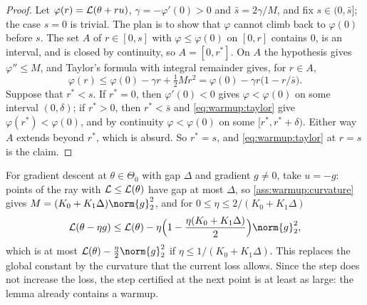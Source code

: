 \begin{refsection}
\begin{proof}
Let $\varphi(r)=\mathcal{L}(\theta+ru)$, $\gamma=-\varphi'(0)>0$ and $\bar s=2\gamma/M$, and fix $s\in(0,\bar s]$; the case $s=0$ is trivial. The plan is to show that $\varphi$ cannot climb back to $\varphi(0)$ before $s$. The set $A$ of $r\in[0,s]$ with $\varphi\le\varphi(0)$ on $[0,r]$ contains $0$, is an interval, and is closed by continuity, so $A=[0,r^*]$. On $A$ the hypothesis gives $\varphi''\le M$, and Taylor's formula with integral remainder gives, for $r\in A$,
\begin{equation}\label{eq:warmup:taylor}
  \varphi(r)\le\varphi(0)-\gamma r+\tfrac12Mr^2=\varphi(0)-\gamma r\bigl(1-r/\bar s\bigr).
\end{equation}
Suppose that $r^*<s$. If $r^*=0$, then $\varphi'(0)<0$ gives $\varphi<\varphi(0)$ on some interval $(0,\delta)$; if $r^*>0$, then $r^*<\bar s$ and \eqref{eq:warmup:taylor} give $\varphi(r^*)<\varphi(0)$, and by continuity $\varphi<\varphi(0)$ on some $[r^*,r^*+\delta)$. Either way $A$ extends beyond $r^*$, which is absurd. So $r^*=s$, and \eqref{eq:warmup:taylor} at $r=s$ is the claim.
\end{proof}

For gradient descent at $\theta\in\Theta_0$ with gap $\Delta$ and gradient $g\ne0$, take $u=-g$: points of the ray with $\mathcal{L}\le\mathcal{L}(\theta)$ have gap at most $\Delta$, so \cref{ass:warmup:curvature} gives $M=(K_0+K_1\Delta)\norm{g}_2^2$, and for $0\le\eta\le2/(K_0+K_1\Delta)$
\begin{equation}\label{eq:warmup:gd}
  \Loss(\theta-\eta g)\le\Loss(\theta)-\eta\Bigl(1-\frac{\eta(K_0+K_1\Delta)}2\Bigr)\norm{g}_2^2,
\end{equation}
which is at most $\Loss(\theta)-\frac\eta2\norm{g}_2^2$ if $\eta\le1/(K_0+K_1\Delta)$. This  replaces the global constant by the curvature that the current loss allows. Since the step does not increase the loss, the step certified at the next point is at least as large: the lemma already contains a warmup.


\end{refsection}
